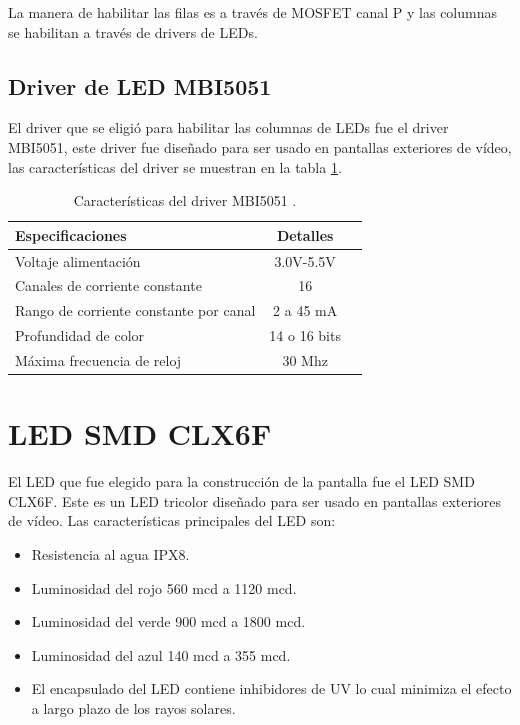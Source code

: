 
La manera de habilitar las filas es a través de MOSFET canal P y las columnas se habilitan a través de drivers de LEDs.
 
 





\subsection{Driver de LED MBI5051}
El driver que se eligió para habilitar las columnas de LEDs fue el driver MBI5051, este driver fue diseñado para ser usado en pantallas exteriores de vídeo, las características del driver se muestran en la tabla \ref{tab:driverled}.

\begin{table}[h]
\centering
\caption[Características MBI5051]{Características del driver MBI5051 \protect\footnotemark.}
\begin{tabular}{l c c}
\toprule
\textbf{Especificaciones}& \textbf{Detalles}\\
\midrule 

Voltaje alimentación & 3.0V-5.5V\\
Canales de corriente constante & 16\\
Rango de corriente constante por canal & 2 a 45 mA\\
Profundidad de color & 14 o 16 bits\\
Máxima frecuencia de reloj & 30 Mhz\\

\bottomrule
\hline
\end{tabular}
\label{tab:driverled}
\end{table}


\section{LED SMD CLX6F}
El LED que fue elegido para la construcción de la pantalla fue el LED SMD CLX6F. Este es un LED tricolor diseñado para ser usado en pantallas exteriores de vídeo. Las características principales del LED son:
\begin{itemize}
\item Resistencia al agua IPX8.
\item Luminosidad del rojo 560 mcd a 1120 mcd.
\item Luminosidad del verde 900 mcd a 1800 mcd.
\item Luminosidad del azul 140 mcd a 355 mcd.
\item El encapsulado del LED contiene inhibidores de UV lo cual minimiza el efecto a largo plazo de los rayos solares.
\end{itemize}


